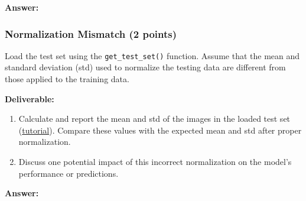 \documentclass[11pt, oneside]{article}   	%
\begin{document}
\begin{answerbox} \textbf{Answer:} \vspace*{1cm}

\end{answerbox}


\subsubsection*{Normalization Mismatch (2 points)}

Load the test set using the \texttt{get\_test\_set()} function. Assume that the mean and standard deviation (std) used to normalize the testing data are different from those applied to the training data.

\noindent\textbf{Deliverable:}

\begin{enumerate} \item Calculate and report the mean and std of the images in the loaded test set (\href{https://stackoverflow.com/questions/73350133/how-to-calculate-mean-and-standard-deviation-of-a-set-of-images}{tutorial}). Compare these values with the expected mean and std after proper normalization.

\item Discuss one potential impact of this incorrect normalization on the model's performance or predictions. 

\end{enumerate}

\begin{answerbox} \textbf{Answer:} \vspace*{1cm}


\end{answerbox}
\end{document}
